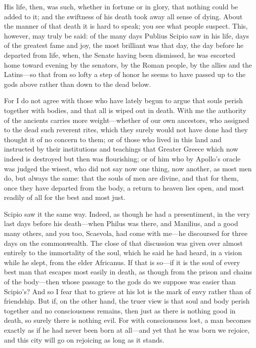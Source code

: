  His life, then, was such, whether in fortune or in glory, that nothing could be added to it; and the swiftness of his death took away all sense of dying. About the manner of that death it is hard to speak; you see what people suspect. This, however, may truly be said: of the many days Publius Scipio saw in his life, days of the greatest fame and joy, the most brilliant was that day, the day before he departed from life, when, the Senate having been dismissed, he was escorted home toward evening by the senators, by the Roman people, by the allies and the Latins—so that from so lofty a step of honor he seems to have passed up to the gods above rather than down to the dead below.

 For I do not agree with those who have lately begun to argue that souls perish together with bodies, and that all is wiped out in death. With me the authority of the ancients carries more weight—whether of our own ancestors, who assigned to the dead such reverent rites, which they surely would not have done had they thought it of no concern to them; or of those who lived in this land and instructed by their institutions and teachings that Greater Greece which now indeed is destroyed but then was flourishing; or of him who by Apollo's oracle was judged the wisest, who did not say now one thing, now another, as most men do, but always the same: that the souls of men are divine, and that for them, once they have departed from the body, a return to heaven lies open, and most readily of all for the best and most just.

 Scipio saw it the same way. Indeed, as though he had a presentiment, in the very last days before his death—when Philus was there, and Manilius, and a good many others, and you too, Scaevola, had come with me—he discoursed for three days on the commonwealth. The close of that discussion was given over almost entirely to the immortality of the soul, which he said he had heard, in a vision while he slept, from the elder Africanus. If that is so—if it is the soul of every best man that escapes most easily in death, as though from the prison and chains of the body—then whose passage to the gods do we suppose was easier than Scipio's? And so I fear that to grieve at his lot is the mark of envy rather than of friendship. But if, on the other hand, the truer view is that soul and body perish together and no consciousness remains, then just as there is nothing good in death, so surely there is nothing evil. For with consciousness lost, a man becomes exactly as if he had never been born at all—and yet that he was born we rejoice, and this city will go on rejoicing as long as it stands.

